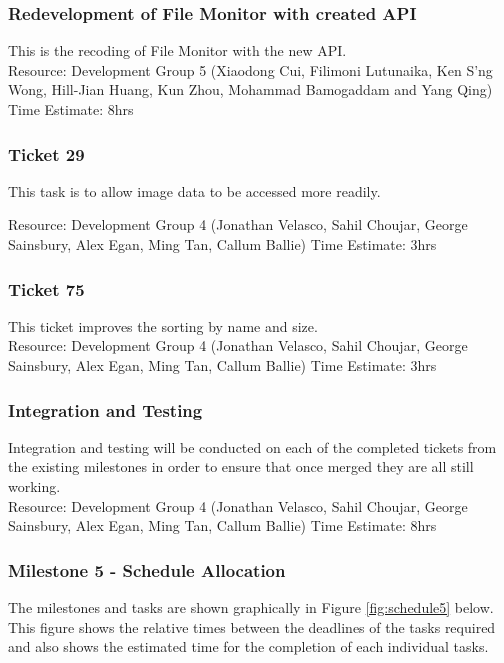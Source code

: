 \documentclass{article}
\begin{document}
\subsubsection{Redevelopment of File Monitor with created API}
	This is the recoding of File Monitor with the new API.\\
	
	Resource: Development Group 5 (Xiaodong Cui, Filimoni Lutunaika, Ken S'ng Wong, Hill-Jian Huang, Kun Zhou, Mohammad Bamogaddam and Yang Qing)
	Time Estimate: 8hrs
	
\subsubsection{Ticket 29}
	This task is to allow image data to be accessed more readily.
	
	Resource: Development Group 4 (Jonathan Velasco, Sahil Choujar, George Sainsbury, Alex Egan, Ming Tan, Callum Ballie)
	Time Estimate: 3hrs

\subsubsection{Ticket 75}
	This ticket improves the sorting by name and size.\\
	
	Resource: Development Group 4 (Jonathan Velasco, Sahil Choujar, George Sainsbury, Alex Egan, Ming Tan, Callum Ballie)
	Time Estimate: 3hrs

\subsubsection{Integration and Testing}
	Integration and testing will be conducted on each of the completed tickets from the existing milestones in order to ensure that once merged they are all still working.\\
	
	Resource: Development Group 4 (Jonathan Velasco, Sahil Choujar, George Sainsbury, Alex Egan, Ming Tan, Callum Ballie)
	Time Estimate: 8hrs

\subsubsection{Milestone 5 - Schedule Allocation}

The milestones and tasks are shown graphically in Figure \ref{fig:schedule5} below. This figure shows the relative times between the deadlines of the tasks required and also shows the estimated time for the completion of each individual tasks.\\
\end{document}
